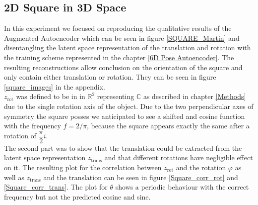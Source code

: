 \documentclass[10pt,a4paper]{article}
\newcommand{\rot}{\ensuremath{\text{rot}\xspace}}
\newcommand{\trans}{\ensuremath{\text{trans}\xspace}}
\begin{document}
\subsection{2D Square in 3D Space}\label{Square}
In this experiment we focused on reproducing the qualitative results of the Augmented Autoencoder which can be seen in figure \ref{SQUARE_Martin} and disentangling the latent space representation of the translation and rotation with the training scheme represented in the chapter \ref{6D Pose Autoencoder}. The resulting reconstructions allow conclusion on the orientation of the square and only contain either translation or rotation. They can be seen in figure \ref{square_images} in the appendix.\\
$z_{\rot}$ was defined to be in in $\mathbb{R}^2$ representing $\mathbb{C}$ as described in chapter \ref{Methods} due to the single rotation axis of the object. Due to the two perpendicular axes of symmetry the square posses we anticipated to see a shifted and cosine function with the frequency $f = 2/ \pi$, because the square appears exactly the same after a rotation of $\dfrac{\pi}{2}i$. \\
The second part was to show that the translation could be extracted from the latent space representation $z_{\trans}$ and that different rotations have negligible effect on it. The resulting plot for the correlation between $z_{\rot}$ and the rotation $\varphi$ as well as $z_{\trans}$ and the translation can be seen in figure \ref{Square_corr_rot} and \ref{Square_corr_trans}. 
The plot for $\theta$ shows a periodic behaviour with the correct frequency but not the predicted cosine and sine.
\end{document}
